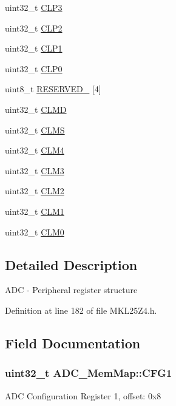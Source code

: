 \begin{DoxyCompactItemize}
\item 
uint32\+\_\+t \hyperlink{struct_a_d_c___mem_map_a6c77f6b67fa1eccf3549bcf27933f5e7}{C\+L\+P3}
\item 
uint32\+\_\+t \hyperlink{struct_a_d_c___mem_map_aac028a79faac6929bebb1b677b2fbf8b}{C\+L\+P2}
\item 
uint32\+\_\+t \hyperlink{struct_a_d_c___mem_map_ae99b44e06b93a2b62451162abe0aae92}{C\+L\+P1}
\item 
uint32\+\_\+t \hyperlink{struct_a_d_c___mem_map_a936082703bd7b18447b8edeeaa3c0c4f}{C\+L\+P0}
\item 
uint8\+\_\+t \hyperlink{struct_a_d_c___mem_map_ab6a26e3e3250e5cf4ee9d2fe63d28a82}{R\+E\+S\+E\+R\+V\+E\+D\+\_} \mbox{[}4\mbox{]}
\item 
uint32\+\_\+t \hyperlink{struct_a_d_c___mem_map_ad78aef04412250c47f943c007ad2eed2}{C\+L\+MD}
\item 
uint32\+\_\+t \hyperlink{struct_a_d_c___mem_map_ad4519a320afe549d5b275b534be9bc39}{C\+L\+MS}
\item 
uint32\+\_\+t \hyperlink{struct_a_d_c___mem_map_a7b8d8ae0f052a3824d3b34dffdf471e0}{C\+L\+M4}
\item 
uint32\+\_\+t \hyperlink{struct_a_d_c___mem_map_a326c171566746f11f9b808930253df85}{C\+L\+M3}
\item 
uint32\+\_\+t \hyperlink{struct_a_d_c___mem_map_a2794a4dac3b6ec18535eeae7c7e2d4e3}{C\+L\+M2}
\item 
uint32\+\_\+t \hyperlink{struct_a_d_c___mem_map_a6c07d3719b54b23926239b53919f36d2}{C\+L\+M1}
\item 
uint32\+\_\+t \hyperlink{struct_a_d_c___mem_map_a1b8eeb87fa8308fe93200b6e82985c25}{C\+L\+M0}
\end{DoxyCompactItemize}


\subsection{Detailed Description}
A\+DC -\/ Peripheral register structure 

Definition at line 182 of file M\+K\+L25\+Z4.\+h.



\subsection{Field Documentation}
\subsubsection[{\texorpdfstring{C\+F\+G1}{CFG1}}]{\setlength{\rightskip}{0pt plus 5cm}uint32\+\_\+t A\+D\+C\+\_\+\+Mem\+Map\+::\+C\+F\+G1}\hypertarget{struct_a_d_c___mem_map_a2320de82d9559e930bc71650b02993b7}{}\label{struct_a_d_c___mem_map_a2320de82d9559e930bc71650b02993b7}
A\+DC Configuration Register 1, offset\+: 0x8 

